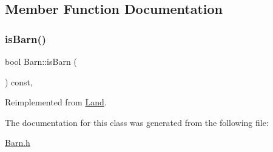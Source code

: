 \subsection{Member Function Documentation}
\mbox{\label{classBarn_a716f3e1ecf4d4d37fe934d29425841a1}} 
\subsubsection{\texorpdfstring{isBarn()}{isBarn()}}
{\footnotesize\ttfamily bool Barn\+::is\+Barn (\begin{DoxyParamCaption}{ }\end{DoxyParamCaption}) const\hspace{0.3cm}{\ttfamily [inline]}, {\ttfamily [virtual]}}



Reimplemented from \mbox{\hyperlink{classLand_a0e7a4fa66fb495bada48ac00974bf5a7}{Land}}.



The documentation for this class was generated from the following file\+:\begin{DoxyCompactItemize}
\item 
\mbox{\hyperlink{Barn_8h}{Barn.\+h}}\end{DoxyCompactItemize}
